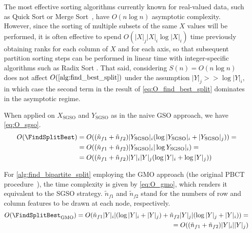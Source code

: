 The most effective sorting algorithms currently known for real-valued data, such as Quick Sort or Merge Sort~\cite{}, have $O(n \log n)$ asymptotic complexity. However, since the sorting of multiple subsets of the same $X$ values will be performed, it is often effective to spend $O(|X|_j|X|_i\log |X|_i)$ time previously obtaining ranks for each column of $X$ and for each axis, so that subsequent partition sorting steps can be performed in linear time with integer-specific algorithms such as Radix Sort \cite{}.
%
That said, considering $S(n) = O(n \log n)$ does not affect $O(\ref{alg:find_best_split})$ under the assumption $|Y|_j >> \log |Y|_i$, in which case the second term in the result of \autoref{eq:O_find_best_split} dominates in the asymptotic regime.


When applied on $X_\text{SGSO}$ and $Y_\text{SGSO}$ as in the naive GSO approach, we have \autoref{eq:O_sgso}.
%
\begin{align}
    O(\FindSplitBest)
    &= O(
        (\tilde n_{f1} + \tilde n_{f2})
        |Y_\text{SGSO}|_i
        (\log |Y_\text{SGSO}|_i + |Y_\text{SGSO}|_j)
    )
    =\nonumber\\
    &= O((\tilde n_{f1} + \tilde n_{f2}) |Y_\text{SGSO}|_i|\log Y_\text{SGSO}|_i)
    =\nonumber\\
    &= O((\tilde n_{f1} + \tilde n_{f2}) |Y|_i|Y|_j (\log |Y|_i + \log |Y|_j))
    \label{eq:O_sgso}
\end{align}

For \ref{alg:find_bipartite_split} employing the GMO approach (the original PBCT procedure~\cite{pliakos2018global}), the time complexity is given by \autoref{eq:O_gmo}, which renders it equivalent to the SGSO strategy. $\tilde n_{f1}$ and $\tilde n_{f2}$ stand for the numbers of row and column features to be drawn at each node, respectively.
%
\begin{align}
    O(\FindSplitBest_\text{GMO})
    = O(
        \tilde n_{f1} |Y|_i|(\log |Y|_i + |Y|_j)
        + \tilde n_{f2} |Y|_j|(\log |Y|_j + |Y|_i)
    )
    =\nonumber\\
    = O((\tilde n_{f1} + \tilde n_{f2}) |Y|_i||Y|_j)
    \label{eq:O_gmo}
\end{align}

